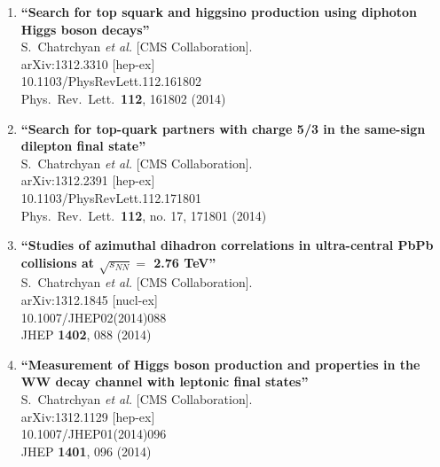 \documentclass{article}
\begin{document}
\begin{enumerate}
\item%
{\bf ``Search for top squark and higgsino production using diphoton Higgs boson decays''}
  \\{}S.~Chatrchyan {\it et al.}  [CMS Collaboration].
  \\{}arXiv:1312.3310 [hep-ex]
    \\{}10.1103/PhysRevLett.112.161802
\\{}Phys.\ Rev.\ Lett.\  {\bf 112}, 161802 (2014) %


\item%
{\bf ``Search for top-quark partners with charge 5/3 in the same-sign dilepton final state''}
  \\{}S.~Chatrchyan {\it et al.}  [CMS Collaboration].
  \\{}arXiv:1312.2391 [hep-ex]
    \\{}10.1103/PhysRevLett.112.171801
\\{}Phys.\ Rev.\ Lett.\  {\bf 112}, no. 17, 171801 (2014) %


\item%
{\bf ``Studies of azimuthal dihadron correlations in ultra-central PbPb collisions at $\sqrt{s_{NN}} =$ 2.76 TeV''}
  \\{}S.~Chatrchyan {\it et al.}  [CMS Collaboration].
  \\{}arXiv:1312.1845 [nucl-ex]
    \\{}10.1007/JHEP02(2014)088
\\{}JHEP {\bf 1402}, 088 (2014) %


\item%
{\bf ``Measurement of Higgs boson production and properties in the WW decay channel with leptonic final states''}
  \\{}S.~Chatrchyan {\it et al.}  [CMS Collaboration].
  \\{}arXiv:1312.1129 [hep-ex]
    \\{}10.1007/JHEP01(2014)096
\\{}JHEP {\bf 1401}, 096 (2014) %



\end{enumerate}
\end{document}
